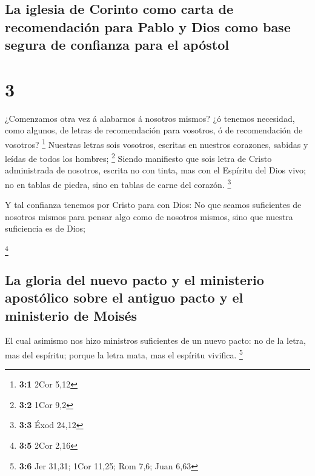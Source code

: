 \hypertarget{la-iglesia-de-corinto-como-carta-de-recomendaciuxf3n-para-pablo-y-dios-como-base-segura-de-confianza-para-el-apuxf3stol}{%
\subsection{La iglesia de Corinto como carta de recomendación para Pablo
y Dios como base segura de confianza para el
apóstol}\label{la-iglesia-de-corinto-como-carta-de-recomendaciuxf3n-para-pablo-y-dios-como-base-segura-de-confianza-para-el-apuxf3stol}}

\hypertarget{section-2}{%
\section{3}\label{section-2}}

 ¿Comenzamos otra vez á alabarnos á nosotros mismos? ¿ó
tenemos necesidad, como algunos, de letras de recomendación para
vosotros, ó de recomendación de vosotros? \footnote{\textbf{3:1} 2Cor
  5,12}  Nuestras letras sois vosotros, escritas en nuestros
corazones, sabidas y leídas de todos los hombres; \footnote{\textbf{3:2}
  1Cor 9,2}  Siendo manifiesto que sois letra de Cristo
administrada de nosotros, escrita no con tinta, mas con el Espíritu del
Dios vivo; no en tablas de piedra, sino en tablas de carne del corazón.
\footnote{\textbf{3:3} Éxod 24,12}

 Y tal confianza tenemos por Cristo para con Dios:
 No que seamos suficientes de nosotros mismos para pensar
algo como de nosotros mismos, sino que nuestra suficiencia es de Dios;

\footnote{\textbf{3:5} 2Cor 2,16}

\hypertarget{la-gloria-del-nuevo-pacto-y-el-ministerio-apostuxf3lico-sobre-el-antiguo-pacto-y-el-ministerio-de-moisuxe9s}{%
\subsection{La gloria del nuevo pacto y el ministerio apostólico sobre
el antiguo pacto y el ministerio de
Moisés}\label{la-gloria-del-nuevo-pacto-y-el-ministerio-apostuxf3lico-sobre-el-antiguo-pacto-y-el-ministerio-de-moisuxe9s}}

 El cual asimismo nos hizo ministros suficientes de un nuevo
pacto: no de la letra, mas del espíritu; porque la letra mata, mas el
espíritu vivifica. \footnote{\textbf{3:6} Jer 31,31; 1Cor 11,25; Rom
  7,6; Juan 6,63}

